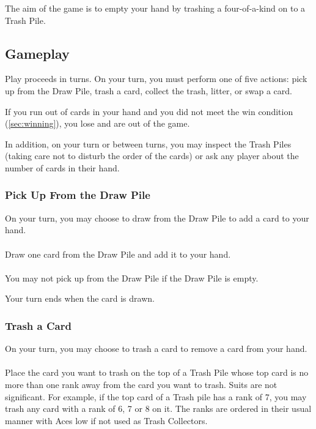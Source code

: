 \documentclass{article}
\begin{document}
The aim of the game is to empty your hand by trashing a four-of-a-kind on to a Trash Pile.

\subsection{Gameplay \label{sec:gameplay}}

Play proceeds in turns. On your turn, you must perform one of five actions: pick up from the Draw Pile, trash a card, collect the trash, litter, or swap a card.

If you run out of cards in your hand and you did not meet the win condition (\autoref{sec:winning}), you lose and are out of the game.

In addition, on your turn or between turns, you may inspect the Trash Piles (taking care not to disturb the order of the cards) or ask any player about the number of cards in their hand.

\newpage
\subsubsection{Pick Up From the Draw Pile \label{sec:draw}}

On your turn, you may choose to draw from the Draw Pile to add a card to your hand.

\paragraph{\label{par:drawnormal}}
Draw one card from the Draw Pile and add it to your hand.

\paragraph{\label{par:drawempty}}
You may not pick up from the Draw Pile if the Draw Pile is empty.

Your turn ends when the card is drawn.

\subsubsection{Trash a Card \label{sec:trashcard}}

On your turn, you may choose to trash a card to remove a card from your hand.

\paragraph{\label{par:trashvalid}}
Place the card you want to trash on the top of a Trash Pile whose top card is no more than one rank away from the card you want to trash. Suits are not significant. For example, if the top card of a Trash pile has a rank of 7, you may trash any card with a rank of 6, 7 or 8 on it.
The ranks are ordered in their usual manner with Aces low if not used as Trash Collectors.
\end{document}
